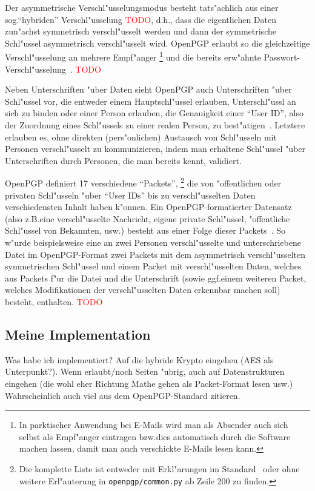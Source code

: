 \documentclass[12pt]{article}
\newcommand{\todo}[1]{\textcolor{red}{\mbox{TODO}}\marginpar{\textcolor{red}{#1}}}
\begin{document}
Der asymmetrische Verschl"usselungsmodus besteht tats"achlich aus einer sog.\@ "`hybriden"'
Verschl"usselung \todo{Bild?}, d.h.\@, dass die eigentlichen Daten zun"achst symmetrisch verschl"usselt werden
und dann der symmetrische Schl"ussel asymmetrisch verschl"usselt wird.
OpenPGP erlaubt so die gleichzeitige Verschl"usselung an mehrere Empf"anger%
\footnote{In parktischer Anwendung bei E-Mails wird man als Absender auch sich selbst
als Empf"anger eintragen bzw.\@ dies automatisch durch die Software machen lassen,
damit man auch verschickte E-Mails lesen kann.}
und die bereits erw"ahnte Passwort-Verschl"usselung~\cite{rfc4480}.
\todo{Spezifische Beispiele f"ur Alogrithmen?}

Neben Unterschriften "uber Daten sieht OpenPGP auch Unterschriften "uber Schl"ussel vor,
die entweder einem Hauptschl"ussel erlauben, Unterschl"ussl an sich zu binden oder
einer Person erlauben, die Genauigkeit einer "`User ID"', also der Zuordnung eines Schl"ussels
zu einer realen Person, zu best"atigen~\cite{rfc4480}.
Letztere erlauben es, ohne direkten (pers"onlichen) Austausch von Schl"usseln mit Personen
verschl"usselt zu kommunizieren, indem man erhaltene Schl"ussel "uber Unterschriften
durch Personen, die man bereits kennt, validiert.

OpenPGP definiert 17 verschiedene "`Packets"',%
\footnote{Die komplette Liste ist entweder mit Erkl"arungen im Standard~\cite{rfc4480}
oder ohne weitere Erl"auterung in \texttt{openpgp/common.py} ab Zeile 200 zu finden.}
die von "offentlichen oder privaten Schl"usseln "uber
"`User IDs"' bis zu verschl"usselten Daten verschiedensten Inhalt haben k"onnen.
Ein OpenPGP-formatierter Datensatz (also z.B.\@ eine verschl"usselte Nachricht, eigene private Schl"ussel,
"offentliche Schl"ussel von Bekannten, usw.\@) besteht aus einer Folge dieser Packets~\cite{rfc4480}.
So w"urde beispielsweise eine an zwei Personen verschl"usselte und unterschriebene Datei im OpenPGP-Format
zwei Packets mit dem asymmetrisch verschl"usselten symmetrischen Schl"ussel und einem Packet mit
verschl"usselten Daten, welches aus Packets f"ur die Datei und die Unterschrift
(sowie ggf.\@ einem weiteren Packet, welches Modifikationen der verschl"usselten Daten erkennbar machen soll)
besteht, enthalten. \todo{Bild?}

\subsection{Meine Implementation}
Was habe ich implementiert? Auf die hybride Krypto eingehen (AES als Unterpunkt?). Wenn erlaubt/noch Seiten "ubrig, auch auf Datenstrukturen eingehen (die wohl eher Richtung Mathe gehen als Packet-Format lesen usw.)
Wahrscheinlich auch viel aus dem OpenPGP-Standard zitieren.
\end{document}
